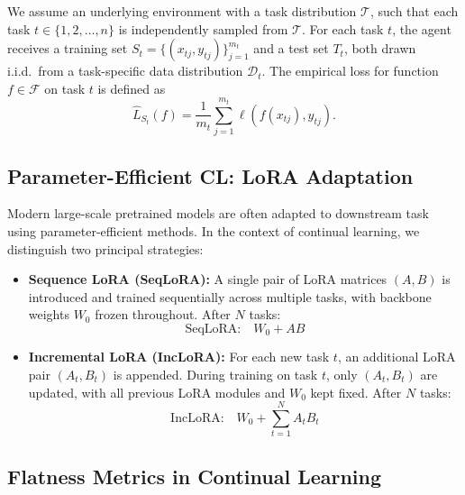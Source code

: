 \documentclass[letterpaper]{article} %
\begin{document}
We assume an underlying environment with a task distribution $\mathcal{T}$, such that each task $t \in \{1, 2, \ldots, n\}$ is independently sampled from $\mathcal{T}$. For each task $t$, the agent receives a training set $S_t = \{(x_{tj}, y_{tj})\}_{j=1}^{m_t}$ and a test set $T_t$, both drawn i.i.d.\ from a task-specific data distribution $\mathcal{D}_t$. The empirical loss for function $f \in \mathcal{F}$ on task $t$ is defined as
\begin{equation}
    \hat{L}_{S_t}(f) = \frac{1}{m_t} \sum_{j=1}^{m_t} \ell(f(x_{tj}), y_{tj}).
\end{equation}

\subsection{Parameter-Efficient CL: LoRA Adaptation}

Modern large-scale pretrained models are often adapted to downstream task using parameter-efficient methods. In the context of continual learning, we distinguish two principal strategies:
\begin{itemize}
    \item \textbf{Sequence LoRA (SeqLoRA):} A single  pair of LoRA matrices $(A, B)$ is introduced and trained sequentially across multiple tasks, with backbone weights $W_0$ frozen throughout. After $N$ tasks:
    $$
        \text{SeqLoRA:} \quad W_0 + AB
    $$
    \item \textbf{Incremental LoRA (IncLoRA):} For each new task $t$, an additional LoRA pair $(A_t, B_t)$ is appended. During training on task $t$, only $(A_t, B_t)$ are updated, with all previous LoRA modules and $W_0$ kept fixed.  After $N$ tasks:
    \begin{equation*}
        \text{IncLoRA:} \quad W_0 + \sum_{t=1}^N A_t B_t
    \end{equation*}
\end{itemize}


\subsection{Flatness Metrics in Continual Learning}
\end{document}

